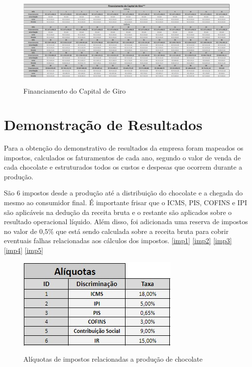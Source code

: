 \documentclass[
	12pt,				%
	openright,			%
	oneside,			%
	a4paper,			%
	english,			%
	french,				%
	spanish,			%
	brazil				%
	]{abntex2}
\begin{document}
\begin{landscape}

\begin{figure}[]
\begin{center}
\caption{Financiamento do Capital de Giro}
\includegraphics[scale=0.5]{a4.jpeg} 
\label{fin2}
\end{center}
\end{figure}

\end{landscape}

\section{Demonstração de Resultados}

Para a obtenção do demonstrativo de resultados da empresa foram mapeados os impostos, calculados os faturamentos de cada ano, segundo o valor de venda de cada chocolate e estruturados todos os custos e despesas que ocorrem durante a produção.

São 6 impostos desde a produção até a distribuição do chocolate e a chegada do mesmo ao consumidor final. É importante frisar que o ICMS, PIS, COFINS e IPI são aplicáveis na dedução da receita bruta e o restante são aplicados sobre o resultado operacional líquido. Além disso, foi adicionada uma reserva de impostos no valor de 0,5$\%$ que está sendo calculada sobre a receita bruta para cobrir eventuais falhas relacionadas aos cálculos dos impostos. \ref{imp1} \ref{imp2} \ref{imp3} \ref{imp4} \ref{imp5}

\begin{figure}[H]
\begin{center}
\caption{Alíquotas de impostos relacionadas a produção de chocolate}
\includegraphics[scale=0.5]{a5.jpeg} 
\label{-}
\end{center}
\end{figure}
\end{document}
